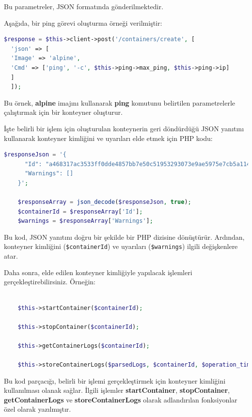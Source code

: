 Bu parametreler, JSON formatında gönderilmektedir.

Aşağıda, bir ping görevi oluşturma örneği verilmiştir:

\begin{lstlisting}[language=PHP]
  $response = $this->client->post('/containers/create', [
  'json' => [
  'Image' => 'alpine',
  'Cmd' => ['ping', '-c', $this->ping->max_ping, $this->ping->ip]
  ]
  ]);
  \end{lstlisting}

Bu örnek, \textbf{alpine} imajını kullanarak \textbf{ping} komutunu belirtilen parametrelerle çalıştırmak için bir konteyner oluşturur.


İşte belirli bir işlem için oluşturulan konteynerin geri döndürdüğü JSON yanıtını kullanarak konteyner kimliğini ve uyarıları elde etmek için PHP kodu:

\begin{lstlisting}[language=PHP]
	$responseJson = '{
	  "Id": "a468317ac3533ff0dde4857bb7e50c51953293073e9ae5975e7cb5a114b8463a",
	  "Warnings": []
	}';
	
	$responseArray = json_decode($responseJson, true);
	$containerId = $responseArray['Id'];
	$warnings = $responseArray['Warnings'];
\end{lstlisting}

Bu kod, JSON yanıtını doğru bir şekilde bir PHP dizisine dönüştürür. Ardından, konteyner kimliğini (\texttt{\$containerId}) ve uyarıları (\texttt{\$warnings}) ilgili değişkenlere atar.

Daha sonra, elde edilen konteyner kimliğiyle yapılacak işlemleri gerçekleştirebilirsiniz. Örneğin:

\begin{lstlisting}[language=PHP]
	
	$this->startContainer($containerId);
	
	$this->stopContainer($containerId);
	
	$this->getContainerLogs($containerId);
	
	$this->storeContainerLogs($parsedLogs, $containerId, $operation_time);
\end{lstlisting}

Bu kod parçacığı, belirli bir işlemi gerçekleştirmek için konteyner kimliğini kullanılması olanak sağlar. İlgili işlemler \textbf{startContainer}, \textbf{stopContainer}, \textbf{getContainerLogs} ve \textbf{storeContainerLogs} olarak adlandırılan fonksiyonlar özel olarak yazılmıştır.

